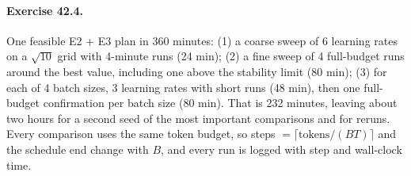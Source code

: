 \paragraph{Exercise 42.4.} One feasible E2 + E3 plan in 360 minutes: (1) a coarse sweep of 6 learning
rates on a $\sqrt{10}$ grid with 4-minute runs (24 min); (2) a fine sweep of 4 full-budget runs around
the best value, including one above the stability limit (80 min); (3) for each of 4 batch sizes,
3 learning rates with short runs (48 min), then one full-budget confirmation per batch size
(80 min). That is 232 minutes, leaving about two hours for a second seed of the most important
comparisons and for reruns. Every comparison uses the same token budget, so steps $=\lceil
\text{tokens}/(BT)\rceil$ and the schedule end change with $B$, and every run is logged with step
and wall-clock time.
